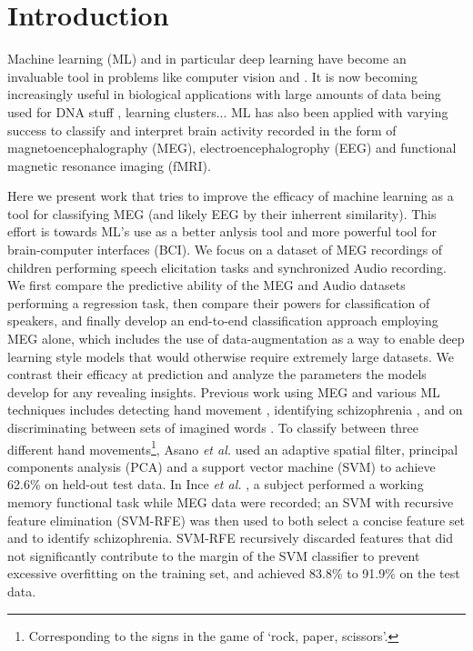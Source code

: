 \documentclass[utf8]{frontiersSCNS} %
\begin{document}
\section{Introduction}


Machine learning (ML) and in particular deep learning have become an invaluable tool in problems like computer vision and . It is now becoming increasingly useful in biological applications with large amounts of data being used for DNA stuff \cite{}, learning clusters... ML has also been applied with varying success to classify and interpret brain activity recorded in the form of magnetoencephalography (MEG), electroencephalogrophy (EEG) and functional magnetic resonance imaging (fMRI).

Here we present work that tries to improve the efficacy of machine learning as a tool for classifying MEG (and likely EEG by their inherrent similarity). This effort is towards ML's use as a better anlysis tool and more powerful tool for brain-computer interfaces (BCI). We focus on a dataset of MEG recordings of children performing speech elicitation tasks and synchronized Audio recording. We first compare the predictive ability of the MEG and Audio datasets performing a regression task, then compare their powers for classification of speakers, and finally develop an end-to-end classification approach employing MEG alone, which includes the use of data-augmentation as a way to enable deep learning style models that would otherwise require extremely large datasets. We contrast their efficacy at prediction and analyze the parameters the models develop for any revealing insights. Previous work using MEG and various ML techniques includes detecting hand movement \cite{Asano2009}, identifying schizophrenia \cite{Ince2008}, and on discriminating between sets of imagined words \cite{Guimaraes2007}. To classify between three different hand movements\footnote{Corresponding to the signs in the game of `rock, paper, scissors'.}, Asano {\em et al.} \cite{Asano2009} used an adaptive spatial filter, principal components analysis (PCA) and a support vector machine (SVM) to achieve 62.6\% on held-out test data. In Ince {\em et al.} \cite{Ince2008}, a subject performed a working memory functional task while MEG data were recorded; an SVM with recursive feature elimination (SVM-RFE) was then used to both select a concise feature set and to identify schizophrenia. SVM-RFE recursively discarded features that did not significantly contribute to the margin of the SVM classifier to prevent excessive overfitting on the training set, and achieved 83.8\% to 91.9\% on the test data.
\end{document}
